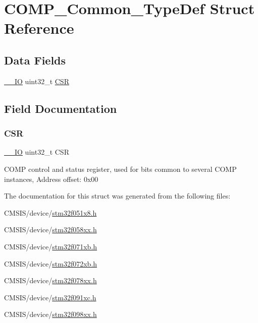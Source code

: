 \hypertarget{struct_c_o_m_p___common___type_def}{}\section{C\+O\+M\+P\+\_\+\+Common\+\_\+\+Type\+Def Struct Reference}
\label{struct_c_o_m_p___common___type_def}
\subsection*{Data Fields}
\begin{DoxyCompactItemize}
\item 
\hyperlink{core__sc300_8h_aec43007d9998a0a0e01faede4133d6be}{\+\_\+\+\_\+\+IO} uint32\+\_\+t \hyperlink{struct_c_o_m_p___common___type_def_a876dd0a8546697065f406b7543e27af2}{C\+SR}
\end{DoxyCompactItemize}


\subsection{Field Documentation}
\mbox{\label{struct_c_o_m_p___common___type_def_a876dd0a8546697065f406b7543e27af2}} 
\subsubsection{\texorpdfstring{C\+SR}{CSR}}
{\footnotesize\ttfamily \hyperlink{core__sc300_8h_aec43007d9998a0a0e01faede4133d6be}{\+\_\+\+\_\+\+IO} uint32\+\_\+t C\+SR}

C\+O\+MP control and status register, used for bits common to several C\+O\+MP instances, Address offset\+: 0x00 

The documentation for this struct was generated from the following files\+:\begin{DoxyCompactItemize}
\item 
C\+M\+S\+I\+S/device/\hyperlink{stm32f051x8_8h}{stm32f051x8.\+h}\item 
C\+M\+S\+I\+S/device/\hyperlink{stm32f058xx_8h}{stm32f058xx.\+h}\item 
C\+M\+S\+I\+S/device/\hyperlink{stm32f071xb_8h}{stm32f071xb.\+h}\item 
C\+M\+S\+I\+S/device/\hyperlink{stm32f072xb_8h}{stm32f072xb.\+h}\item 
C\+M\+S\+I\+S/device/\hyperlink{stm32f078xx_8h}{stm32f078xx.\+h}\item 
C\+M\+S\+I\+S/device/\hyperlink{stm32f091xc_8h}{stm32f091xc.\+h}\item 
C\+M\+S\+I\+S/device/\hyperlink{stm32f098xx_8h}{stm32f098xx.\+h}\end{DoxyCompactItemize}
